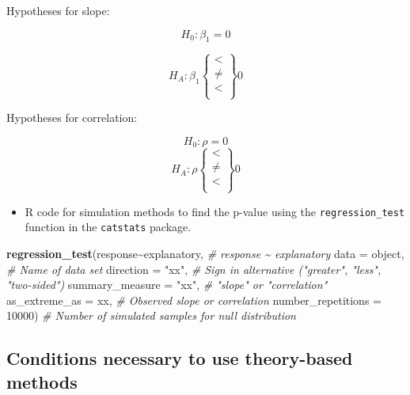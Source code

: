 \documentclass[
]{report}
\newenvironment{Shaded}{\begin{snugshade}}{\end{snugshade}}
\newcommand{\AttributeTok}[1]{\textcolor[rgb]{0.13,0.29,0.53}{#1}}
\newcommand{\CommentTok}[1]{\textcolor[rgb]{0.56,0.35,0.01}{\textit{#1}}}
\newcommand{\DecValTok}[1]{\textcolor[rgb]{0.00,0.00,0.81}{#1}}
\newcommand{\FunctionTok}[1]{\textcolor[rgb]{0.13,0.29,0.53}{\textbf{#1}}}
\newcommand{\NormalTok}[1]{#1}
\newcommand{\SpecialCharTok}[1]{\textcolor[rgb]{0.81,0.36,0.00}{\textbf{#1}}}
\newcommand{\StringTok}[1]{\textcolor[rgb]{0.31,0.60,0.02}{#1}}
\providecommand{\tightlist}{%
  \setlength{\itemsep}{0pt}\setlength{\parskip}{0pt}}
\begin{document}
Hypotheses for slope:

\[H_0: \beta_1 = 0\]

\[H_A: \beta_1 \left\{
\begin{array}{ll}
< \\
\ne \\
< \\
\end{array}
\right\}
0\]

Hypotheses for correlation:

\[H_0: \rho = 0\]
\[H_A: \rho \left\{
\begin{array}{ll}
< \\
\ne \\
< \\
\end{array}
\right\}
0\]

\begin{itemize}
\tightlist
\item
  R code for simulation methods to find the p-value using the \texttt{regression\_test} function in the \texttt{catstats} package.
\end{itemize}

\begin{Shaded}
\begin{Highlighting}[]
\FunctionTok{regression\_test}\NormalTok{(response}\SpecialCharTok{\textasciitilde{}}\NormalTok{explanatory, }\CommentTok{\# response \textasciitilde{} explanatory}
               \AttributeTok{data =}\NormalTok{ object, }\CommentTok{\# Name of data set}
               \AttributeTok{direction =} \StringTok{"xx"}\NormalTok{, }\CommentTok{\# Sign in alternative ("greater", "less", "two{-}sided")}
               \AttributeTok{summary\_measure =} \StringTok{"xx"}\NormalTok{, }\CommentTok{\# "slope" or "correlation"}
               \AttributeTok{as\_extreme\_as =}\NormalTok{ xx, }\CommentTok{\# Observed slope or correlation}
               \AttributeTok{number\_repetitions =} \DecValTok{10000}\NormalTok{) }\CommentTok{\# Number of simulated samples for null distribution}
\end{Highlighting}
\end{Shaded}

\subsection*{Conditions necessary to use theory-based methods}\label{conditions-necessary-to-use-theory-based-methods}
\end{document}
